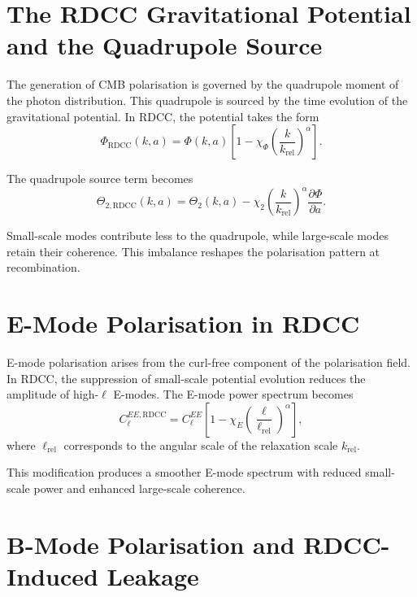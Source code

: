 \documentclass[11pt,a4paper]{article}
\begin{document}
\section{The RDCC Gravitational Potential and the Quadrupole Source}

The generation of CMB polarisation is governed by the quadrupole moment of the 
photon distribution. This quadrupole is sourced by the time evolution of the 
gravitational potential. In RDCC, the potential takes the form
\begin{equation}
    \Phi_{\mathrm{RDCC}}(k,a)
    = \Phi(k,a)
      \left[
        1 - \chi_{\Phi}
        \left(\frac{k}{k_{\mathrm{rel}}}\right)^{\alpha}
      \right].
\end{equation}

The quadrupole source term becomes
\begin{equation}
    \Theta_{2,\mathrm{RDCC}}(k,a)
    = \Theta_{2}(k,a)
      - \chi_{2}
        \left(\frac{k}{k_{\mathrm{rel}}}\right)^{\alpha}
        \frac{\partial \Phi}{\partial a}.
\end{equation}

Small-scale modes contribute less to the quadrupole, while large-scale modes 
retain their coherence. This imbalance reshapes the polarisation pattern at 
recombination.
\section{E-Mode Polarisation in RDCC}

E-mode polarisation arises from the curl-free component of the polarisation field. 
In RDCC, the suppression of small-scale potential evolution reduces the amplitude 
of high-$\ell$ E-modes. The E-mode power spectrum becomes
\begin{equation}
    C_{\ell}^{EE,\mathrm{RDCC}}
    = C_{\ell}^{EE}
      \left[
        1 - \chi_{E}
        \left(\frac{\ell}{\ell_{\mathrm{rel}}}\right)^{\alpha}
      \right],
\end{equation}
where $\ell_{\mathrm{rel}}$ corresponds to the angular scale of the relaxation 
scale $k_{\mathrm{rel}}$.

This modification produces a smoother E-mode spectrum with reduced small-scale 
power and enhanced large-scale coherence.
\section{B-Mode Polarisation and RDCC-Induced Leakage}
\end{document}
